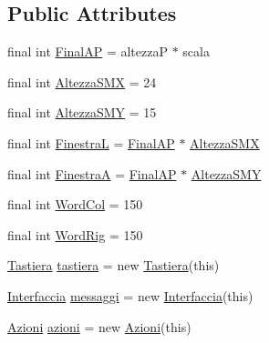 \subsection*{Public Attributes}
\begin{DoxyCompactItemize}
\item 
final int \hyperlink{classa_1_1survival_1_1game_1_1_pannello_a254f39b8c0d713267b41082239e95bed}{Final\+AP} = altezzaP $\ast$ scala
\item 
final int \hyperlink{classa_1_1survival_1_1game_1_1_pannello_a3373f5f9365b8e16cdf3a7bb6d6c0bc9}{Altezza\+S\+MX} = 24
\item 
final int \hyperlink{classa_1_1survival_1_1game_1_1_pannello_ac5f4442e9873fde75688c00c817c49f6}{Altezza\+S\+MY} = 15
\item 
final int \hyperlink{classa_1_1survival_1_1game_1_1_pannello_a319dcf1279476cf946d73808e782d39c}{FinestraL} = \hyperlink{classa_1_1survival_1_1game_1_1_pannello_a254f39b8c0d713267b41082239e95bed}{Final\+AP} $\ast$ \hyperlink{classa_1_1survival_1_1game_1_1_pannello_a3373f5f9365b8e16cdf3a7bb6d6c0bc9}{Altezza\+S\+MX}
\item 
final int \hyperlink{classa_1_1survival_1_1game_1_1_pannello_aa40a02fd0e358e545d2d3669b38dcc90}{FinestraA} = \hyperlink{classa_1_1survival_1_1game_1_1_pannello_a254f39b8c0d713267b41082239e95bed}{Final\+AP} $\ast$ \hyperlink{classa_1_1survival_1_1game_1_1_pannello_ac5f4442e9873fde75688c00c817c49f6}{Altezza\+S\+MY}
\item 
final int \hyperlink{classa_1_1survival_1_1game_1_1_pannello_ae2957af001a1ecbc4831d6eddcecb539}{Word\+Col} = 150
\item 
final int \hyperlink{classa_1_1survival_1_1game_1_1_pannello_a1b6b63331c98b61b838b1834813d57cb}{Word\+Rig} = 150
\item 
\hyperlink{classa_1_1survival_1_1game_1_1_tastiera}{Tastiera} \hyperlink{classa_1_1survival_1_1game_1_1_pannello_aa81b2ff7f225716affd276a1fff16da7}{tastiera} = new \hyperlink{classa_1_1survival_1_1game_1_1_tastiera}{Tastiera}(this)
\item 
\hyperlink{classa_1_1survival_1_1game_1_1_interfaccia}{Interfaccia} \hyperlink{classa_1_1survival_1_1game_1_1_pannello_aa4c65a419ff3f1f90a582300f0473acd}{messaggi} = new \hyperlink{classa_1_1survival_1_1game_1_1_interfaccia}{Interfaccia}(this)
\item 
\hyperlink{classa_1_1survival_1_1game_1_1_azioni}{Azioni} \hyperlink{classa_1_1survival_1_1game_1_1_pannello_a99f79150ef5f334200f8f4e42301d9c5}{azioni} = new \hyperlink{classa_1_1survival_1_1game_1_1_azioni}{Azioni}(this)

\end{DoxyCompactItemize}
